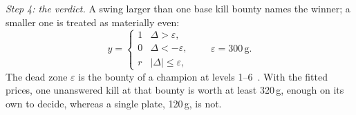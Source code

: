 \emph{Step 4: the verdict.} A swing larger than one base kill bounty names the winner; a smaller one
is treated as materially even:
\begin{equation}\label{eq:label-verdict}
y = \begin{cases}
1 & \Delta > \varepsilon,\\
0 & \Delta < -\varepsilon,\\
r & |\Delta| \le \varepsilon,
\end{cases}
\qquad \varepsilon = 300\,\mathrm{g}.
\end{equation}
The dead zone $\varepsilon$ is the bounty of a champion at levels 1--6~\cite{lolwiki2026bounties,riot2025patch2509}.
With the fitted prices, one unanswered kill at that bounty is worth at least 320\,g, enough on its
own to decide, whereas a single plate, 120\,g, is not.

